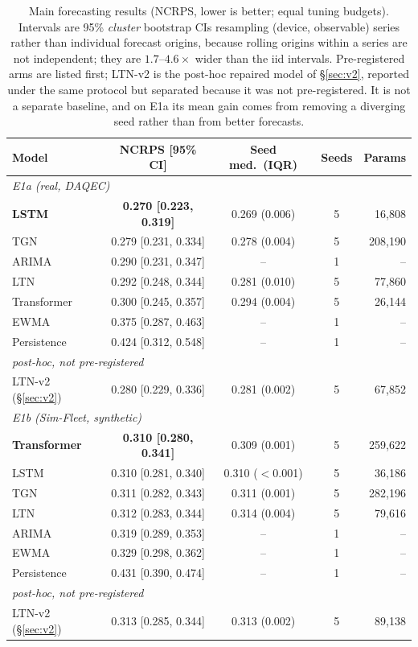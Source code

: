 \documentclass[journal]{IEEEtran}
\begin{document}
\begin{table}[t]\centering\caption{Main forecasting results (NCRPS, lower is
better; equal tuning budgets). Intervals are 95\% \emph{cluster} bootstrap CIs
resampling (device, observable) series rather than individual forecast origins, because
rolling origins within a series are not independent; they are $1.7$--$4.6\times$
wider than the iid intervals. Pre-registered arms are listed first; LTN-v2 is the
post-hoc repaired model of \S\ref{sec:v2}, reported under the same protocol but
separated because it was not pre-registered. It is not a separate baseline, and on
E1a its mean gain comes from removing a diverging seed rather than from better
forecasts.}
\label{tab:main}
\footnotesize\setlength{\tabcolsep}{3.2pt}
\begin{tabular}{lcccr}
\toprule
Model & NCRPS [95\% CI] & Seed med.\ (IQR) & Seeds & Params \\
\midrule
\multicolumn{5}{l}{\emph{E1a (real, DAQEC)}} \\
\textbf{LSTM} & \textbf{0.270 [0.223, 0.319]} & 0.269 (0.006) & 5 & 16,808 \\
TGN & 0.279 [0.231, 0.334] & 0.278 (0.004) & 5 & 208,190 \\
ARIMA & 0.290 [0.231, 0.347] & -- & 1 & -- \\
LTN & 0.292 [0.248, 0.344] & 0.281 (0.010) & 5 & 77,860 \\
Transformer & 0.300 [0.245, 0.357] & 0.294 (0.004) & 5 & 26,144 \\
EWMA & 0.375 [0.287, 0.463] & -- & 1 & -- \\
Persistence & 0.424 [0.312, 0.548] & -- & 1 & -- \\
\midrule
\multicolumn{5}{l}{\emph{post-hoc, not pre-registered}} \\
LTN-v2 (\S\ref{sec:v2}) & 0.280 [0.229, 0.336] & 0.281 (0.002) & 5 & 67,852 \\
\midrule
\multicolumn{5}{l}{\emph{E1b (Sim-Fleet, synthetic)}} \\
\textbf{Transformer} & \textbf{0.310 [0.280, 0.341]} & 0.309 (0.001) & 5 & 259,622 \\
LSTM & 0.310 [0.281, 0.340] & 0.310 ($<$0.001) & 5 & 36,186 \\
TGN & 0.311 [0.282, 0.343] & 0.311 (0.001) & 5 & 282,196 \\
LTN & 0.312 [0.283, 0.344] & 0.314 (0.004) & 5 & 79,616 \\
ARIMA & 0.319 [0.289, 0.353] & -- & 1 & -- \\
EWMA & 0.329 [0.298, 0.362] & -- & 1 & -- \\
Persistence & 0.431 [0.390, 0.474] & -- & 1 & -- \\
\midrule
\multicolumn{5}{l}{\emph{post-hoc, not pre-registered}} \\
LTN-v2 (\S\ref{sec:v2}) & 0.313 [0.285, 0.344] & 0.313 (0.002) & 5 & 89,138 \\
\bottomrule
\end{tabular}
\end{table}
\end{document}
